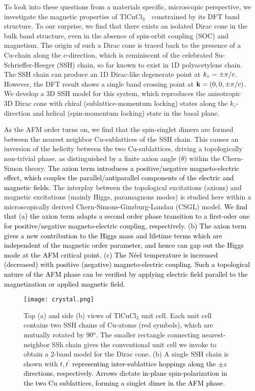 \documentclass[aps,prl,showpacs,twocolumn,groupedaddress]{revtex4-1}
\newcommand{\TCC}{TlCuCl$_3$~}
\newcommand{\blue}{\textcolor{black}}
\begin{document}
To look into these questions from a materials specific, microscopic perspective, we investigate the magnetic properties of \TCC~constrained by its DFT band structure. To our surprise, we find that there exists an isolated Dirac cone in the bulk band structure, even in the absence of spin-orbit coupling (SOC) and magnetism. The origin of such a Dirac cone is traced back to the presence of a Cu-chain along the \blue{$c$}-direction, which is reminiscent of the celebrated Su-Schrieffer-Heeger (SSH) chain, so far known to exist in 1D polyacetylene chain.\cite{SSH} The SSH chain can produce an 1D Dirac-like degenerate point at $k_z=\pm\pi/\blue{c}$. However, the DFT result shows a single band crossing point at ${\bf k}=(0,0,\pm\pi/\blue{c})$. We develop a 3D SSH model for this system, which reproduces the anisotropic 3D Dirac cone with chiral (sublattice-momentum locking) states along the $k_z$-direction and helical (spin-momentum locking) state in the basal plane.

As the AFM order turns on, we find that the spin-singlet dimers are formed between the nearest neighbor Cu-sublattices of the SSH chain. This causes an inversion of the helicity between the two Cu-sublattices, driving a topologically non-trivial phase, as distinguished by a finite axion angle ($\theta$) within the Chern-Simon theory. \blue{The axion term introduces a positive/negative magneto-electric effect, which couples the parallel/antiparallel components of the electric and magnetic fields.} The interplay between the topological excitations (axions) and magnetic excitations (mainly Higgs, paramagnons modes) is studied here within a microscopically derived Chern-Simons-Ginzburg-Landau (CSGL) model. \blue{We find that (a) the axion term adapts a second order phase transition to a first-oder one for positive/negative magneto-electric coupling, respectively. (b) The axion term gives a new contribution to the Higgs mass and lifetime terms which are independent of the magnetic order parameter, and hence can gap out the Higgs mode at the AFM critical point. (c) The N\'eel temperature is increased (decreased) with positive (negative) magneto-electric coupling. Such a topological nature of the AFM phase can be verified by applying electric field parallel to the magnetization or applied magnetic field.}

\begin{figure}[t]
	\texttt{[image: crystal.png]}
	\caption{Top (a) and side (b) views of TlCuCl$_3$ unit cell. Each unit cell contains two SSH chains of Cu-atoms (red symbols), which are mutually rotated by 90$^o$.  The smaller rectangle connecting nearest-neighbor SSh chain gives the conventional unit cell we invoke to obtain a 2-band model for the Dirac cone. (b) A single SSH chain is shown with \blue{$t,t^\prime$ representing inter-sublattice hoppings along the $\pm z$ directions, respectively. Arrows dictate in-plane spin-polarization in the two Cu sublattices, forming a singlet dimer in the AFM phase}.} 
\label{fig:structure}
\end{figure}
\end{document}
